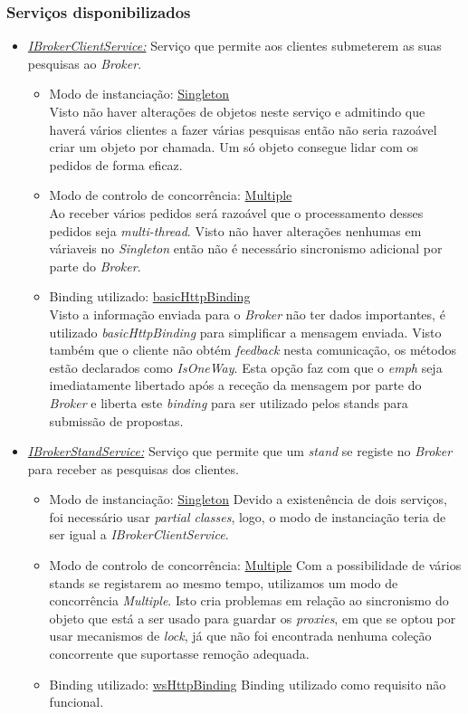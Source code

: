 \documentclass[a4paper]{article}
\begin{document}
\subsubsection{Serviços disponibilizados}
\begin{itemize} 

\item
\emph{\underline{IBrokerClientService:}}
Serviço que permite aos clientes submeterem as suas pesquisas ao \emph{Broker}.
	\begin{itemize}
		\item
		Modo de instanciação: \underline{Singleton}\\
		Visto não haver alterações de objetos neste serviço e admitindo que haverá vários clientes a fazer várias pesquisas então não seria razoável criar um objeto por chamada. Um só objeto consegue lidar com os pedidos de forma eficaz.
		\item
		Modo de controlo de concorrência: \underline{Multiple}\\
		Ao receber vários pedidos será razoável que o processamento desses pedidos seja \emph{multi-thread}. Visto não haver alterações nenhumas em váriaveis no \emph{Singleton} então não é necessário sincronismo adicional por parte do \emph{Broker}.
		\item
		Binding utilizado: \underline{basicHttpBinding}\\
		Visto a informação enviada para o \emph{Broker} não ter dados importantes, é utilizado \emph{basicHttpBinding} para simplificar a mensagem enviada. Visto também que o cliente não obtém \emph{feedback} nesta comunicação, os métodos estão declarados como \emph{IsOneWay}. Esta opção faz com que o \emph{emph} seja imediatamente libertado após a receção da mensagem por parte do \emph{Broker} e liberta este \emph{binding } para ser utilizado pelos stands para submissão de propostas.
	\end{itemize}
\item
\emph{\underline{IBrokerStandService:}}
Serviço que permite que um \emph{stand} se registe no \emph{Broker} para receber as pesquisas dos clientes.
		\begin{itemize}
		\item
		Modo de instanciação: \underline{Singleton}
		Devido a existenência de dois serviços, foi necessário usar \emph{partial classes}, logo, o modo de instanciação teria de ser igual a \emph{IBrokerClientService}.
		\item
		Modo de controlo de concorrência: \underline{Multiple}
		Com a possibilidade de vários stands se registarem ao mesmo tempo, utilizamos um modo de concorrência \emph{Multiple}. Isto cria problemas em relação ao sincronismo do objeto que está a ser usado para guardar os \emph{proxies}, em que se optou por usar mecanismos de \emph{lock}, já que não foi encontrada nenhuma coleção concorrente que suportasse remoção adequada.
		
		\item
		Binding utilizado: \underline{wsHttpBinding}
		Binding utilizado como requisito não funcional.
	\end{itemize}
\end{itemize}
\end{document}
